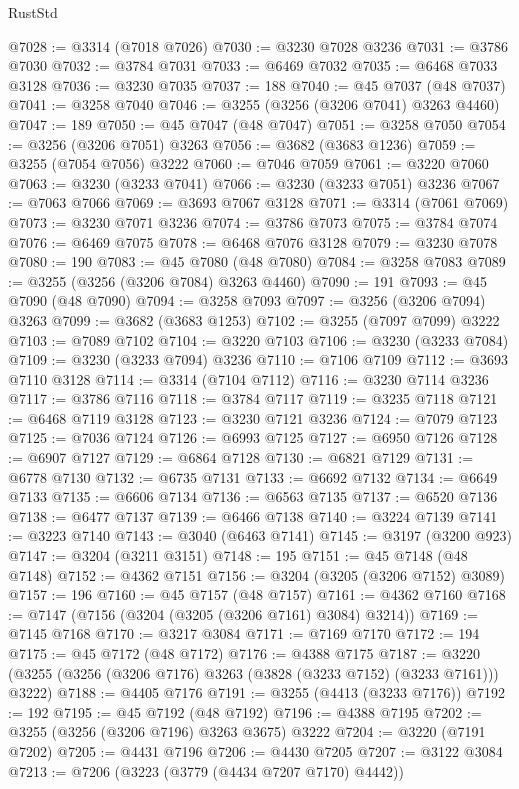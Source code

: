 \begin{lexlean}{RustStd}
\begin{coremodule}
{\begin{coremodule}
{{{{{{{{{{{{{{{{{{{{{{{{{{{{{{{{{{{{{@7028 := @3314 (@7018 @7026)
@7030 := @3230 @7028 @3236
@7031 := @3786 @7030
@7032 := @3784 @7031
@7033 := @6469 @7032
@7035 := @6468 @7033 @3128
@7036 := @3230 @7035
@7037 := 188
@7040 := @45 @7037 (@48 @7037)
@7041 := @3258 @7040
@7046 := @3255 (@3256 (@3206 @7041) @3263 @4460)
@7047 := 189
@7050 := @45 @7047 (@48 @7047)
@7051 := @3258 @7050
@7054 := @3256 (@3206 @7051) @3263
@7056 := @3682 (@3683 @1236)
@7059 := @3255 (@7054 @7056) @3222
@7060 := @7046 @7059
@7061 := @3220 @7060
@7063 := @3230 (@3233 @7041)
@7066 := @3230 (@3233 @7051) @3236
@7067 := @7063 @7066
@7069 := @3693 @7067 @3128
@7071 := @3314 (@7061 @7069)
@7073 := @3230 @7071 @3236
@7074 := @3786 @7073
@7075 := @3784 @7074
@7076 := @6469 @7075
@7078 := @6468 @7076 @3128
@7079 := @3230 @7078
@7080 := 190
@7083 := @45 @7080 (@48 @7080)
@7084 := @3258 @7083
@7089 := @3255 (@3256 (@3206 @7084) @3263 @4460)
@7090 := 191
@7093 := @45 @7090 (@48 @7090)
@7094 := @3258 @7093
@7097 := @3256 (@3206 @7094) @3263
@7099 := @3682 (@3683 @1253)
@7102 := @3255 (@7097 @7099) @3222
@7103 := @7089 @7102
@7104 := @3220 @7103
@7106 := @3230 (@3233 @7084)
@7109 := @3230 (@3233 @7094) @3236
@7110 := @7106 @7109
@7112 := @3693 @7110 @3128
@7114 := @3314 (@7104 @7112)
@7116 := @3230 @7114 @3236
@7117 := @3786 @7116
@7118 := @3784 @7117
@7119 := @3235 @7118
@7121 := @6468 @7119 @3128
@7123 := @3230 @7121 @3236
@7124 := @7079 @7123
@7125 := @7036 @7124
@7126 := @6993 @7125
@7127 := @6950 @7126
@7128 := @6907 @7127
@7129 := @6864 @7128
@7130 := @6821 @7129
@7131 := @6778 @7130
@7132 := @6735 @7131
@7133 := @6692 @7132
@7134 := @6649 @7133
@7135 := @6606 @7134
@7136 := @6563 @7135
@7137 := @6520 @7136
@7138 := @6477 @7137
@7139 := @6466 @7138
@7140 := @3224 @7139
@7141 := @3223 @7140
@7143 := @3040 (@6463 @7141)
@7145 := @3197 (@3200 @923)
@7147 := @3204 (@3211 @3151)
@7148 := 195
@7151 := @45 @7148 (@48 @7148)
@7152 := @4362 @7151
@7156 := @3204 (@3205 (@3206 @7152) @3089)
@7157 := 196
@7160 := @45 @7157 (@48 @7157)
@7161 := @4362 @7160
@7168 := @7147 (@7156 (@3204 (@3205 (@3206 @7161) @3084) @3214))
@7169 := @7145 @7168
@7170 := @3217 @3084
@7171 := @7169 @7170
@7172 := 194
@7175 := @45 @7172 (@48 @7172)
@7176 := @4388 @7175
@7187 := @3220 (@3255 (@3256 (@3206 @7176) @3263 (@3828 (@3233 @7152) (@3233 @7161))) @3222)
@7188 := @4405 @7176
@7191 := @3255 (@4413 (@3233 @7176))
@7192 := 192
@7195 := @45 @7192 (@48 @7192)
@7196 := @4388 @7195
@7202 := @3255 (@3256 (@3206 @7196) @3263 @3675) @3222
@7204 := @3220 (@7191 @7202)
@7205 := @4431 @7196
@7206 := @4430 @7205
@7207 := @3122 @3084
@7213 := @7206 (@3223 (@3779 (@4434 @7207 @7170) @4442))
}}}}}}}}}}}}}}}}}}}}}}}}}}}}}}}}}}}}}
\end{coremodule}}
\end{coremodule}
\end{lexlean}
